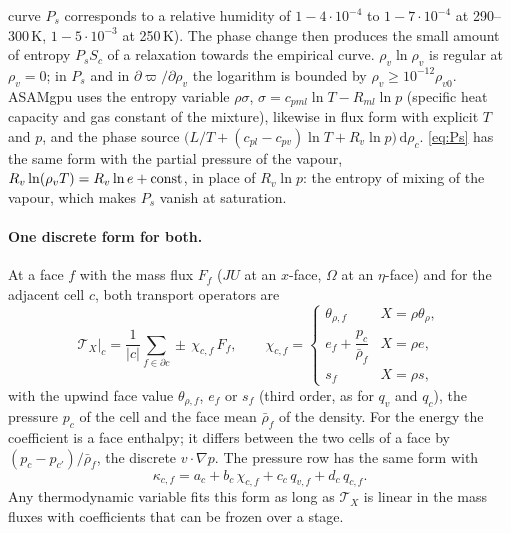 \documentclass[11pt,a4paper]{article}
\newcommand{\pv}{\varpi}      %
\begin{document}
curve $P_s$ corresponds to a relative humidity of $1-4\cdot10^{-4}$ to $1-7\cdot10^{-4}$ at 290--300\,K, $1-5\cdot10^{-3}$ at 250\,K). The phase
change then produces the small amount of entropy $P_sS_c$ of a relaxation towards the empirical curve. $\rho_v\ln\rho_v$
is regular at $\rho_v=0$; in $P_s$ and in $\partial\pv/\partial\rho_v$ the logarithm is bounded by $\rho_v\ge10^{-12}\rho_{v0}$.
ASAMgpu \cite{horn} uses the entropy variable $\rho\sigma$, $\sigma=c_{pml}\ln T-R_{ml}\ln p$ (specific heat capacity and gas constant of the
mixture), likewise in flux form with explicit $T$ and $p$, and the phase source $\big(L/T+(c_{pl}-c_{pv})\ln T+R_v\ln p\big)\,\mathrm d\rho_c$. \eqref{eq:Ps}
has the same form with the partial pressure of the vapour, $R_v\ln(\rho_vT)=R_v\ln e+{\rm const}$, in place of $R_v\ln p$: the
entropy of mixing of the vapour, which makes $P_s$ vanish at saturation.

\paragraph{One discrete form for both.} At a face $f$ with the mass flux $F_f$ ($JU$ at an $x$-face,
$\Omega$ at an $\eta$-face) and for the adjacent cell $c$, both transport operators are
\begin{equation}
\mathcal T_X\big|_c=\frac1{|c|}\sum_{f\in\partial c}\pm\,\chi_{c,f}\,F_f,\qquad
\chi_{c,f}=\begin{cases}\theta_{\rho,f}&X=\rho\theta_\rho,\\[1mm] e_f+\dfrac{p_c}{\bar\rho_f}&X=\rho e,\\[1mm] s_f&X=\rho s,\end{cases}\label{eq:chi}
\end{equation}
with the upwind face value $\theta_{\rho,f}$, $e_f$ or $s_f$ (third order, as for $q_v$ and $q_c$), the
pressure $p_c$ of the cell and the face mean $\bar\rho_f$ of the density. For the energy the
coefficient is a face enthalpy; it differs between the two cells of a face by $(p_c-p_{c'})/\bar\rho_f$,
the discrete $v\cdot\nabla p$. The pressure row has the same form with
\begin{equation}
\kappa_{c,f}=a_c+b_c\,\chi_{c,f}+c_c\,q_{v,f}+d_c\,q_{c,f} .\label{eq:kappa}
\end{equation}
Any thermodynamic variable fits this form as long as $\mathcal T_X$ is linear in the mass fluxes with
coefficients that can be frozen over a stage.

\end{document}

